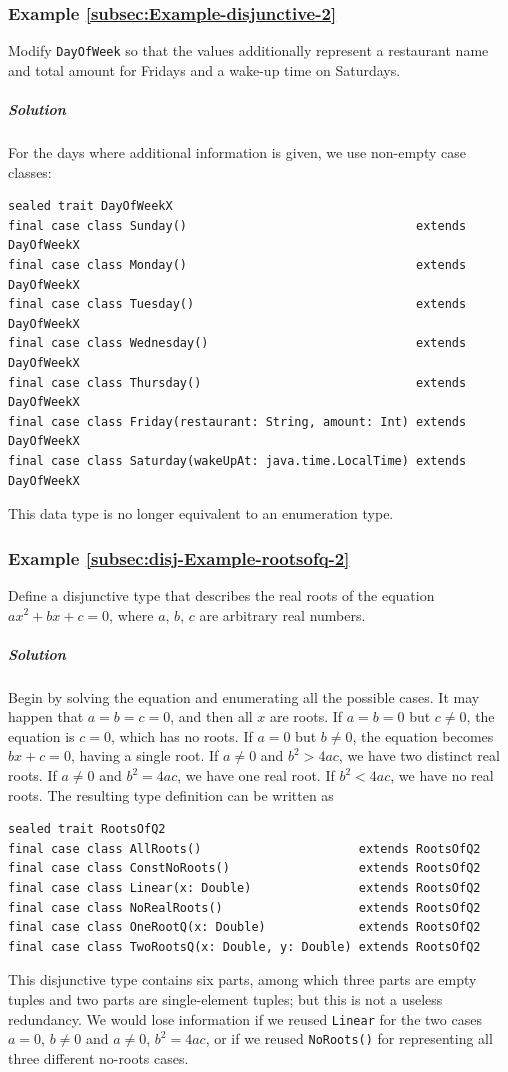 \subsubsection{Example \label{subsec:Example-disjunctive-2}\ref{subsec:Example-disjunctive-2}}

Modify \lstinline!DayOfWeek! so that the values additionally represent
a restaurant name and total amount for Fridays and a wake-up time
on Saturdays. 

\subparagraph{Solution}

For the days where additional information is given, we use non-empty
case classes:
\begin{lstlisting}
sealed trait DayOfWeekX
final case class Sunday()                                extends DayOfWeekX
final case class Monday()                                extends DayOfWeekX
final case class Tuesday()                               extends DayOfWeekX
final case class Wednesday()                             extends DayOfWeekX
final case class Thursday()                              extends DayOfWeekX
final case class Friday(restaurant: String, amount: Int) extends DayOfWeekX
final case class Saturday(wakeUpAt: java.time.LocalTime) extends DayOfWeekX
\end{lstlisting}
This data type is no longer equivalent to an enumeration type.

\subsubsection{Example \label{subsec:disj-Example-rootsofq-2}\ref{subsec:disj-Example-rootsofq-2}}

Define a disjunctive type that describes the real roots of the equation
$ax^{2}+bx+c=0$, where $a$, $b$, $c$ are arbitrary real numbers.

\subparagraph{Solution}

Begin by solving the equation and enumerating all the possible cases.
It may happen that $a=b=c=0$, and then all $x$ are roots. If $a=b=0$
but $c\neq0$, the equation is $c=0$, which has no roots. If $a=0$
but $b\neq0$, the equation becomes $bx+c=0$, having a single root.
If $a\neq0$ and $b^{2}>4ac$, we have two distinct real roots. If
$a\neq0$ and $b^{2}=4ac$, we have one real root. If $b^{2}<4ac$,
we have no real roots. The resulting type definition can be written
as
\begin{lstlisting}
sealed trait RootsOfQ2
final case class AllRoots()                      extends RootsOfQ2
final case class ConstNoRoots()                  extends RootsOfQ2
final case class Linear(x: Double)               extends RootsOfQ2
final case class NoRealRoots()                   extends RootsOfQ2
final case class OneRootQ(x: Double)             extends RootsOfQ2
final case class TwoRootsQ(x: Double, y: Double) extends RootsOfQ2
\end{lstlisting}
This disjunctive type contains six parts, among which three parts
are empty tuples and two parts are single-element tuples; but this
is not a useless redundancy. We would lose information if we reused
\lstinline!Linear! for the two cases $a=0$, $b\neq0$ and $a\neq0$,
$b^{2}=4ac$, or if we reused \lstinline!NoRoots()! for representing
all three different no-roots cases.

